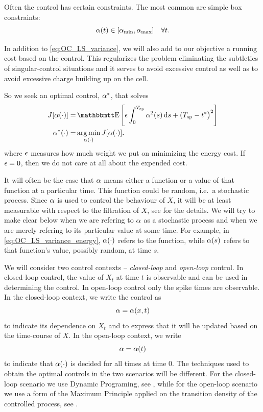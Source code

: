 \documentclass[12pt]{iopart}
\begin{document}
Often the control has certain constraints. The most common are simple box
constraints:
\begin{equation}
{\alpha}(t) \in [{ {\alpha}_{\textrm{min}} }, { {\alpha}_{\textrm{max}} }] \quad \forall t.
\label{eq:bound_constraints_alpha}
\end{equation}

In addition to \cref{eq:OC_LS_variance}, we will also add to our objective a
running cost based on the control. This regularizes the problem eliminating the
subtleties of singular-control situations and it serves to avoid excessive
control as well as to avoid excessive charge building up on the cell.

So we seek an optimal control, ${\alpha}^*$, that solves
\begin{align}
J[\a(\cdot)] =&
\Exp\left[
\e \int_0^\ts  \a^2(s) \intd{s}
+
(\ts - \T \big)^2 \right]
\label{eq:OC_LS_variance_energy}
\\ \notag
\a^*(\cdot) =& \argmin_{\a(\cdot)} J[\a(\cdot)].
\end{align}
where ${\epsilon}$ measures how much weight we put on minimizing the energy cost.
If ${\epsilon} = 0$, then we do not care at all about the expended cost.

It will often be the case that ${\alpha}$ means either a function or a
value of that function at a particular time. This function could be
random, i.e.\ a stochastic process. Since ${\alpha}$ is used to control the behaviour
of $X$, it will be at least measurable with respect to the filtration of $X$,
see \cite{Oksendal2007} for the details. We will try to make clear below when we
are refering to ${\alpha}$ as a stochastic process and when we are merely refering to its particular
value at some time. For example, in \cref{eq:OC_LS_variance_energy}, ${\alpha}(\cdot)$
refers to the function, while ${\alpha}(s)$ refers to that function's value, possibly
random, at time $s$.

We will consider two control contexts -- {\sl closed-loop} and  {\sl open-loop}
control. In closed-loop control, the value of $X_t$ at time $t$ is observable
and can be used in determining the control. In open-loop control only the spike
times are observable. In the closed-loop context, we write the control as $${\alpha} =
{\alpha}(x,t)$$ to indicate its dependence on $X_t$ and to express that it will be
updated based on the time-course of $X$. In the open-loop context, we write $${\alpha}
= {\alpha}(t)$$ to indicate that ${\alpha}(\cdot)$ is decided for all times at time 0. The
techniques used to obtain the optimal controls in the two scenarios will be
different. For the closed-loop scenario we use Dynamic Programing,
see \cite{Fleming1975}, while for the open-loop scenario we use a form of the
Maximum Principle applied on the transition density of the controlled process,
see \cite{Borzi2012}.
\end{document}

